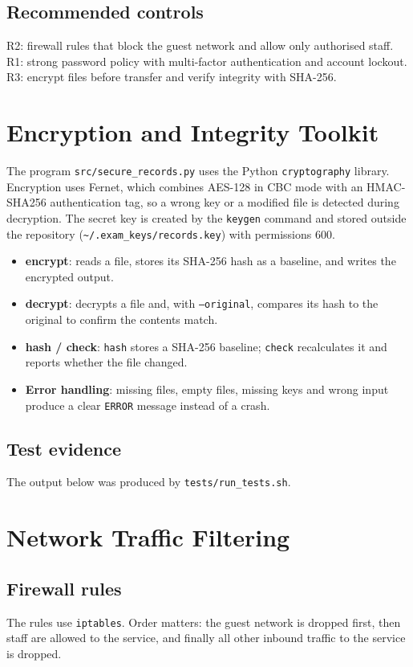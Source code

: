 \documentclass[11pt,a4paper]{article}
\begin{document}
\subsection{Recommended controls}
R2: firewall rules that block the guest network and allow only authorised staff. R1: strong password policy with multi-factor authentication and account lockout. R3: encrypt files before transfer and verify integrity with SHA-256.

\section{Encryption and Integrity Toolkit}
The program \texttt{src/secure\_records.py} uses the Python \texttt{cryptography} library. Encryption uses Fernet, which combines AES-128 in CBC mode with an HMAC-SHA256 authentication tag, so a wrong key or a modified file is detected during decryption. The secret key is created by the \texttt{keygen} command and stored outside the repository (\texttt{\~{}/.exam\_keys/records.key}) with permissions 600.

\begin{itemize}
\item \textbf{encrypt}: reads a file, stores its SHA-256 hash as a baseline, and writes the encrypted output.
\item \textbf{decrypt}: decrypts a file and, with \texttt{--original}, compares its hash to the original to confirm the contents match.
\item \textbf{hash / check}: \texttt{hash} stores a SHA-256 baseline; \texttt{check} recalculates it and reports whether the file changed.
\item \textbf{Error handling}: missing files, empty files, missing keys and wrong input produce a clear \texttt{ERROR} message instead of a crash.
\end{itemize}

\subsection{Test evidence}
The output below was produced by \texttt{tests/run\_tests.sh}.


\section{Network Traffic Filtering}
\subsection{Firewall rules}
The rules use \texttt{iptables}. Order matters: the guest network is dropped first, then staff are allowed to the service, and finally all other inbound traffic to the service is dropped.

\end{document}
